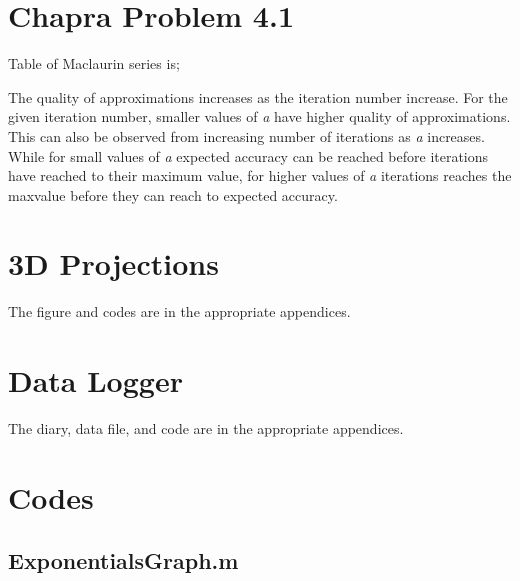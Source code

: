 \documentclass{article}
\begin{document}
\section{Chapra Problem 4.1}
Table of Maclaurin series \cite[p.~120]{Chapra} is; 
\begin{center}
{\tt

}
\end{center}
The quality of approximations increases as the iteration number increase. For the given iteration number, smaller values of \textit{a} have higher quality of approximations. This can also be observed from increasing number of iterations as \textit{a} increases. While for small values of \textit{a} expected accuracy can be reached before iterations have reached to their maximum value, for higher values of \textit{a} iterations reaches the maxvalue before they can reach to expected accuracy.

\section{3D Projections}
The figure and codes are in the appropriate appendices.

\section{Data Logger}
The diary, data file, and code are in the appropriate appendices.
\pagebreak

\appendix
\section{Codes}


\subsection{ExponentialsGraph.m}
\end{document}
